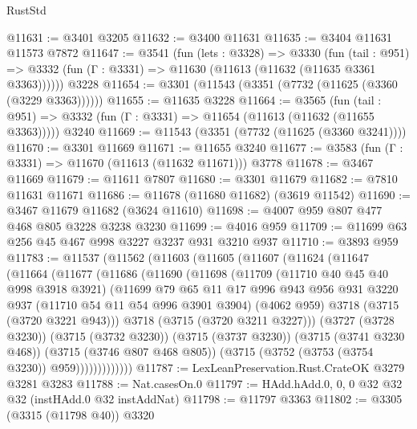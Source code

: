 \begin{lexlean}{RustStd}
\begin{coremodule}
@11631 := @3401 @3205
@11632 := @3400 @11631
@11635 := @3404 @11631 @11573 @7872
@11647 := @3541
    (fun (lets : @3328) =>
    @3330
      (fun (tail : @951) =>
      @3332 (fun (Γ : @3331) => @11630 (@11613 (@11632 (@11635 @3361 @3363))))))
    @3228
@11654 := @3301 (@11543 (@3351 (@7732 (@11625 (@3360 (@3229 @3363))))))
@11655 := @11635 @3228
@11664 := @3565
    (fun (tail : @951) => @3332 (fun (Γ : @3331) => @11654 (@11613 (@11632 (@11655 @3363)))))
    @3240
@11669 := @11543 (@3351 (@7732 (@11625 (@3360 @3241))))
@11670 := @3301 @11669
@11671 := @11655 @3240
@11677 := @3583 (fun (Γ : @3331) => @11670 (@11613 (@11632 @11671))) @3778
@11678 := @3467 @11669
@11679 := @11611 @7807
@11680 := @3301 @11679
@11682 := @7810 @11631 @11671
@11686 := @11678 (@11680 @11682) (@3619 @11542)
@11690 := @3467 @11679 @11682 (@3624 @11610)
@11698 := @4007 @959 @807 @477 @468 @805 @3228 @3238 @3230
@11699 := @4016 @959
@11709 := @11699 @63 @256 @45 @467 @998 @3227 @3237 @931 @3210 @937
@11710 := @3893 @959
@11783 := @11537
    (@11562
      (@11603
        (@11605
          (@11607
            (@11624
              (@11647
                (@11664
                  (@11677
                    (@11686
                      (@11690
                        (@11698
                          (@11709
                            (@11710 @40 @45 @40 @998 @3918 @3921)
                            (@11699
                              @79
                              @65
                              @11
                              @17
                              @996
                              @943
                              @956
                              @931
                              @3220
                              @937
                              (@11710 @54 @11 @54 @996 @3901 @3904)
                              (@4062 @959)
                              @3718
                              (@3715 (@3720 @3221 @943)))
                            @3718
                            (@3715 (@3720 @3211 @3227)))
                          (@3727 (@3728 @3230))
                          (@3715 (@3732 @3230))
                          (@3715 (@3737 @3230))
                          (@3715 (@3741 @3230 @468))
                          (@3715 (@3746 @807 @468 @805))
                          (@3715 (@3752 (@3753 (@3754 @3230)) @959)))))))))))))
@11787 := LexLeanPreservation.Rust.CrateOK @3279 @3281 @3283
@11788 := Nat.casesOn.{0}
@11797 := HAdd.hAdd.{0, 0, 0} @32 @32 @32 (instHAdd.{0} @32 instAddNat)
@11798 := @11797 @3363
@11802 := @3305 (@3315 (@11798 @40)) @3320

\end{coremodule}
\end{lexlean}
